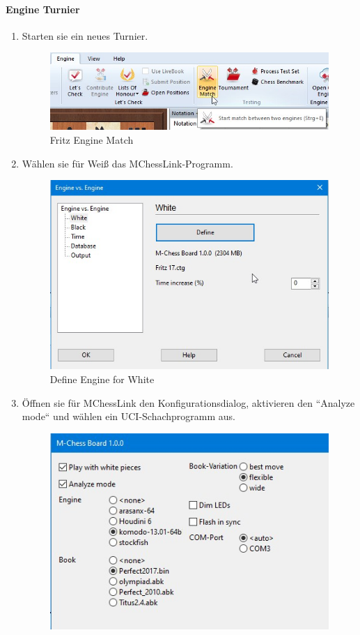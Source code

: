 \documentclass[11pt,a4paper]{article}
\begin{document}
\paragraph{Engine Turnier}
\begin{enumerate}
	\item Starten sie ein neues Turnier.
	\begin{figure}[H]
		\centering
		\includegraphics[scale=0.6]{fritz_enginematch.jpg}
		\caption{Fritz Engine Match}
		\label{fig:FritzEngineMatch}
	\end{figure}
	\item Wählen sie für Weiß das MChessLink-Programm.
	\begin{figure}[H]
		\centering
		\includegraphics[scale=0.6]{fritz_enginewhite.jpg}
		\caption{Define Engine for White}
		\label{fig:FritzEngineWhite}
	\end{figure}
	\item Öffnen sie für MChessLink den Konfigurationsdialog, aktivieren den ``Analyze mode`` und wählen ein UCI-Schachprogramm aus.
	\begin{figure}[H]
		\centering
		\includegraphics[scale=0.8]{fritz_engine_configure_mchesslink_analyze.jpg}

\end{figure}
\end{enumerate}
\end{document}
